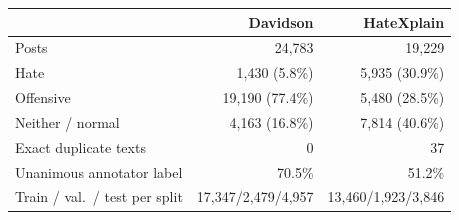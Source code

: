 \begin{tabular}{lrr}
\toprule
 & Davidson & HateXplain \\
\midrule
Posts & 24,783 & 19,229 \\
Hate & 1,430 (5.8\%) & 5,935 (30.9\%) \\
Offensive & 19,190 (77.4\%) & 5,480 (28.5\%) \\
Neither / normal & 4,163 (16.8\%) & 7,814 (40.6\%) \\
Exact duplicate texts & 0 & 37 \\
Unanimous annotator label & 70.5\% & 51.2\% \\
Train / val.\ / test per split & 17,347/2,479/4,957 & 13,460/1,923/3,846 \\
\bottomrule
\end{tabular}

